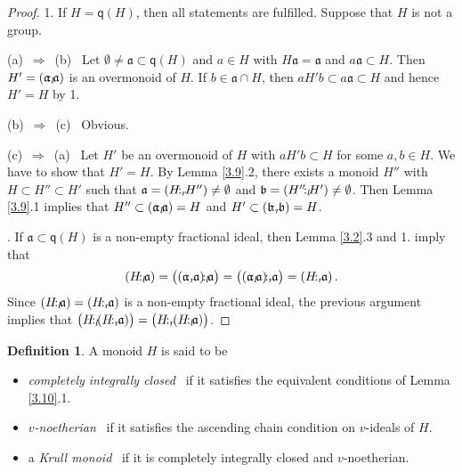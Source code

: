 \documentclass[a4paper]{amsart}
\theoremstyle{definition}
\newtheorem{definition}[theorem]{Definition}
\numberwithin{equation}{section}
\begin{document}
\begin{proof}
1. If $H = \mathsf q (H)$, then all statements are fulfilled.
Suppose that $H$ is not a group.

\smallskip
(a) \,$\Rightarrow$\, (b) \ Let $\emptyset \ne \mathfrak a \subset
\mathsf q (H)$ and $a \in H$ with $H \mathfrak a = \mathfrak a$ and
$a \mathfrak a \subset H$. Then $H' = (\mathfrak a {\negthinspace :_l \negthinspace} \mathfrak
a)$ is an overmonoid of $H$. If $b \in \mathfrak a \cap H$, then
$aH'b \subset a\mathfrak a \subset H$ and hence $H' = H$ by 1.

\smallskip
(b) \,$\Rightarrow$\, (c) \ Obvious.

\smallskip
(c) \,$\Rightarrow$\, (a) \ Let $H'$ be an overmonoid of $H$ with $a
H' b \subset H$ for some $a, b \in H$. We have to show that $H' =
H$. By Lemma \ref{3.9}.2, there exists a monoid $H''$ with $H
\subset H'' \subset H'$ such that $\mathfrak a = (H {\negthinspace :_r \negthinspace} H'') \ne
\emptyset$ and $\mathfrak b = (H'' {\negthinspace :_l \negthinspace} H') \ne \emptyset$. Then
Lemma \ref{3.9}.1 implies that $H'' \subset (\mathfrak a {\negthinspace :_l \negthinspace}
\mathfrak a) = H$ and $H' \subset (\mathfrak b {\negthinspace :_r \negthinspace} \mathfrak b) =
H$.

. If $\mathfrak a \subset \mathsf q (H)$ is a non-empty fractional ideal,
then Lemma \ref{3.2}.3 and 1. imply that
\[
(H {\negthinspace :_l \negthinspace} \mathfrak a) = \big( (\mathfrak a {\negthinspace :_r \negthinspace} \mathfrak a) {\negthinspace :_l \negthinspace} \mathfrak a \big) = \big( ( \mathfrak a {\negthinspace :_l \negthinspace} \mathfrak a) {\negthinspace :_r \negthinspace}
\mathfrak a \big) = ( H {\negthinspace :_r \negthinspace} \mathfrak a) \,.
\]
Since $(H {\negthinspace :_l \negthinspace} \mathfrak a) = (H {\negthinspace :_r \negthinspace} \mathfrak a)$ is a non-empty fractional ideal, the
previous argument implies that \newline $\big( H {\negthinspace :_l \negthinspace} (H {\negthinspace :_r \negthinspace}
\mathfrak a)\big) = \big( H {\negthinspace :_r \negthinspace} (H {\negthinspace :_l \negthinspace} \mathfrak a)\big)$.
\end{proof}

\medskip
\begin{definition} \label{3.11}
A monoid $H$ is said to be
\begin{itemize}
\item {\it completely integrally closed} \ if it satisfies the
equivalent conditions of Lemma \ref{3.10}.1.

\smallskip
\item  {\it $v$-noetherian} \ if it
satisfies the ascending chain condition on $v$-ideals of $H$.

\smallskip
\item a {\it Krull monoid} \ if it is completely integrally closed and $v$-noetherian.
\end{itemize}
\end{definition}
\end{document}
